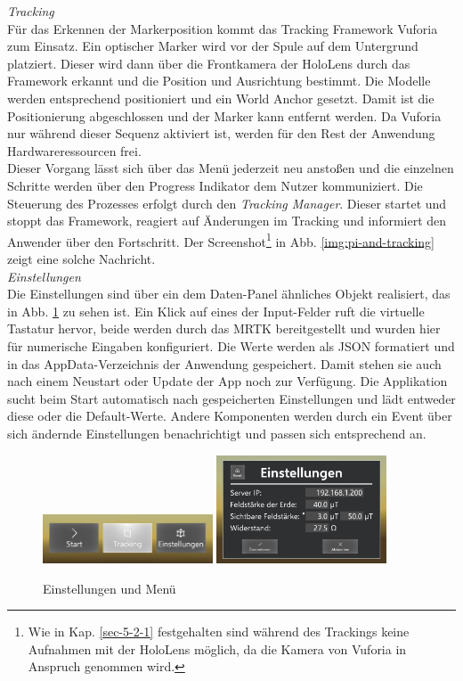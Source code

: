 \textit{Tracking}\\
Für das Erkennen der Markerposition kommt das Tracking Framework Vuforia zum Einsatz. Ein optischer Marker wird vor der Spule auf dem Untergrund platziert. Dieser wird dann über die Frontkamera der HoloLens durch das Framework erkannt und die Position und Ausrichtung bestimmt. Die Modelle werden entsprechend positioniert und ein World Anchor gesetzt. Damit ist die Positionierung abgeschlossen und der Marker kann entfernt werden. Da Vuforia nur während dieser Sequenz aktiviert ist, werden für den Rest der Anwendung Hardwareressourcen frei.\\

Dieser Vorgang lässt sich über das Menü jederzeit neu anstoßen und die einzelnen Schritte werden über den Progress Indikator dem Nutzer kommuniziert. Die Steuerung des Prozesses erfolgt durch den \textit{Tracking Manager}. Dieser startet und stoppt das Framework, reagiert auf Änderungen im Tracking und informiert den Anwender über den Fortschritt. Der Screenshot\footnote{Wie in Kap. \ref{sec-5-2-1} festgehalten sind während des Trackings keine Aufnahmen mit der HoloLens möglich, da die Kamera von Vuforia in Anspruch genommen wird.\nopagebreak} in Abb. \ref{img:pi-and-tracking} zeigt eine solche Nachricht.\\

\textit{Einstellungen}\\
Die Einstellungen sind über ein dem Daten-Panel ähnliches Objekt realisiert, das in Abb. \ref{img:menu-and-settings} zu sehen ist. Ein Klick auf eines der Input-Felder ruft die virtuelle Tastatur hervor, beide werden durch das MRTK bereitgestellt und wurden hier für numerische Eingaben konfiguriert. Die Werte werden als JSON formatiert und in das AppData-Verzeichnis der Anwendung gespeichert. Damit stehen sie auch nach einem Neustart oder Update der App noch zur Verfügung. Die Applikation sucht beim Start automatisch nach gespeicherten Einstellungen und lädt entweder diese oder die Default-Werte. Andere Komponenten werden durch ein Event über sich ändernde Einstellungen benachrichtigt und passen sich entsprechend an.\\

\begin{figure}[H]
	\centering
	\includegraphics[width=0.45\textwidth]{images/menu.jpg}
	\hspace{0.05cm}	
	\includegraphics[width=0.45\textwidth]{images/settings.jpg}
	\caption{Einstellungen und Menü}
	\label{img:menu-and-settings}
\end{figure}


